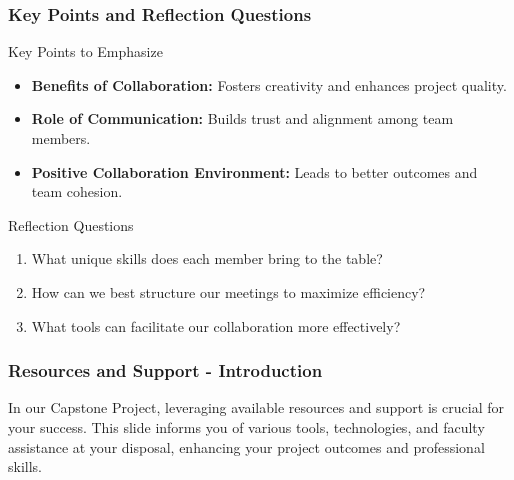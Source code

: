 \documentclass[aspectratio=169]{beamer}
\begin{document}
\begin{frame}[fragile]
    \frametitle{Key Points and Reflection Questions}
    \begin{block}{Key Points to Emphasize}
        \begin{itemize}
            \item \textbf{Benefits of Collaboration:} Fosters creativity and enhances project quality.
            \item \textbf{Role of Communication:} Builds trust and alignment among team members.
            \item \textbf{Positive Collaboration Environment:} Leads to better outcomes and team cohesion.
        \end{itemize}
    \end{block}
    \begin{block}{Reflection Questions}
        \begin{enumerate}
            \item What unique skills does each member bring to the table?
            \item How can we best structure our meetings to maximize efficiency?
            \item What tools can facilitate our collaboration more effectively?
        \end{enumerate}
    \end{block}
\end{frame}

\begin{frame}[fragile]
    \frametitle{Resources and Support - Introduction}
    In our Capstone Project, leveraging available resources and support is crucial for your success. This slide informs you of various tools, technologies, and faculty assistance at your disposal, enhancing your project outcomes and professional skills.
\end{frame}
\end{document}
